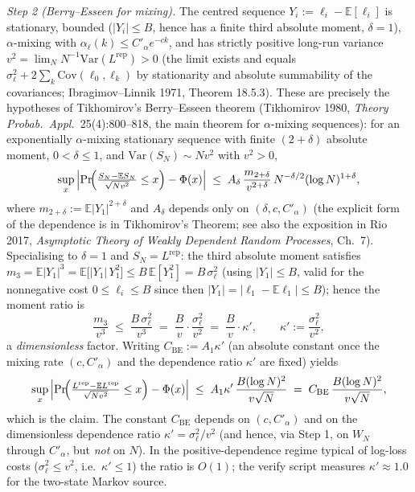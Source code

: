 \documentclass[
]{article}
\begin{document}
\emph{Step 2 (Berry--Esseen for mixing).} The centred sequence
$Y_i := \ell_i - \mathbb{E}[\ell_i]$ is stationary, bounded
($|Y_i| \leq B$, hence has a finite third absolute moment,
$\delta = 1$), $\alpha$-mixing with $\alpha_\ell(k) \leq C'_\alpha
e^{-ck}$, and has strictly positive long-run variance $v^2 =
\lim_{N} N^{-1}\mathrm{Var}(L^{\mathrm{rep}}) > 0$ (the limit exists
and equals $\sigma_\ell^2 + 2\sum_{k} \mathrm{Cov}(\ell_0,\ell_k)$ by
stationarity and absolute summability of the covariances;
Ibragimov--Linnik 1971, Theorem 18.5.3). These are precisely the
hypotheses of Tikhomirov's Berry--Esseen theorem (Tikhomirov 1980,
\emph{Theory Probab.\ Appl.}\ 25(4):800--818, the main theorem for
$\alpha$-mixing sequences): for an exponentially $\alpha$-mixing
stationary sequence with finite $(2+\delta)$ absolute moment,
$0 < \delta \leq 1$, and $\mathrm{Var}(S_N) \sim N v^2$ with $v^2 > 0$,
\[
  \sup_x \left| \Pr\!\Bigl( \tfrac{S_N - \mathbb{E} S_N}{\sqrt{N v^2}}
  \leq x \Bigr) - \Phi(x) \right|
  \;\leq\; A_{\delta}\, \frac{m_{2+\delta}}{v^{2+\delta}}\,
  N^{-\delta/2} (\log N)^{1+\delta} ,
\]
where $m_{2+\delta} := \mathbb{E}|Y_1|^{2+\delta}$ and $A_\delta$
depends only on $(\delta, c, C'_\alpha)$ (the explicit form of the
dependence is in Tikhomirov's Theorem; see also the exposition in Rio
2017, \emph{Asymptotic Theory of Weakly Dependent Random Processes},
Ch.~7).
Specialising to $\delta = 1$ and $S_N = L^{\mathrm{rep}}$: the third
absolute moment satisfies $m_3 = \mathbb{E}|Y_1|^3 = \mathbb{E}\bigl[
|Y_1|\, Y_1^2 \bigr] \leq B\, \mathbb{E}[Y_1^2] = B\, \sigma_\ell^2$
(using $|Y_1| \le B$, valid for the nonnegative cost
$0 \le \ell_i \le B$ since then $|Y_1| = |\ell_1 - \mathbb{E}\ell_1|
\le B$); hence the moment ratio is
\[
  \frac{m_3}{v^3} \;\leq\; \frac{B\, \sigma_\ell^2}{v^3}
  \;=\; \frac{B}{v}\cdot \frac{\sigma_\ell^2}{v^2}
  \;=\; \frac{B}{v}\cdot \kappa' , \qquad
  \kappa' := \frac{\sigma_\ell^2}{v^2} ,
\]
a \emph{dimensionless} factor. Writing $C_{\mathrm{BE}} := A_1 \kappa'$
(an absolute constant once the mixing rate $(c, C'_\alpha)$ and the
dependence ratio $\kappa'$ are fixed) yields
\[
  \sup_x \left| \Pr\!\Bigl( \tfrac{L^{\mathrm{rep}} - \mathbb{E}
  L^{\mathrm{rep}}}{\sqrt{N v^2}} \leq x \Bigr) - \Phi(x) \right|
  \;\leq\; A_1 \kappa'\, \frac{B (\log N)^2}{v \sqrt{N}}
  \;=\; C_{\mathrm{BE}}\, \frac{B (\log N)^2}{v \sqrt{N}} ,
\]
which is the claim. The constant $C_{\mathrm{BE}}$ depends on
$(c, C'_\alpha)$ and on the dimensionless dependence ratio
$\kappa' = \sigma_\ell^2/v^2$ (and hence, via Step 1, on $W_N$ through
$C'_\alpha$, but \emph{not} on $N$). In the positive-dependence regime
typical of log-loss costs ($\sigma_\ell^2 \leq v^2$, i.e.\
$\kappa' \leq 1$) the ratio is $O(1)$; the verify script measures
$\kappa' \approx 1.0$ for the two-state Markov source.
\end{document}
